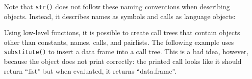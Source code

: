 \begin{itemize}
\begin{Shaded}
\begin{Highlighting}[]
 
\CommentTok{#> \textbackslash{}- ()}
\CommentTok{#>   \textbackslash{}- []}
 \NormalTok{, } \StringTok{ }\StringTok{ }
\CommentTok{#> \textbackslash{}- ()}
\CommentTok{#>   \textbackslash{}- []}
\CommentTok{#>   \textbackslash{}- ()}
\CommentTok{#>     \textbackslash{}- ()}
\end{Highlighting}
\end{Shaded}
\end{itemize}

Note that \texttt{str()} does not follow these naming conventions when
describing objects. Instead, it describes names as symbols and calls as
language objects:

\begin{Shaded}
\begin{Highlighting}[]
\NormalTok{(}
\NormalTok{(}\StringTok{ }
\end{Highlighting}
\end{Shaded}

Using low-level functions, it is possible to create call trees that
contain objects other than constants, names, calls, and pairlists. The
following example uses \texttt{substitute()} to insert a data frame into
a call tree. This is a bad idea, however, because the object does not
print correctly: the printed call looks like it should return ``list''
but when evaluated, it returns ``data.frame''. 

